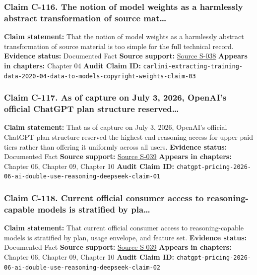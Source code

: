 \documentclass[
  american,
  11pt,
  letterpaper,
]{article}
\begin{document}
\subsubsection{Claim C-116. The notion of model weights as a harmlessly
abstract transformation of source
mat\ldots{}}\label{claim-c-116-the-notion-of-model-weights-as-a-harmlessly-abstract-transformation-of-source-mat}

\textbf{Claim statement:} That the notion of model weights as a
harmlessly abstract transformation of source material is too simple for
the full technical record. \textbf{Evidence status:} Documented Fact
\textbf{Source support:}
\hyperref[source-s-038-extracting-training-data-from-large-language-models]{Source
S-038} \textbf{Appears in chapters:} Chapter 04 \textbf{Audit Claim ID:}
\texttt{carlini-extracting-training-data-2020-04-data-to-models-copyright-weights-claim-03}

\subsubsection{Claim C-117. As of capture on July 3, 2026, OpenAI's
official ChatGPT plan structure
reserved\ldots{}}\label{claim-c-117-as-of-capture-on-july-3-2026-openai-s-official-chatgpt-plan-structure-reserved}

\textbf{Claim statement:} That as of capture on July 3, 2026, OpenAI's
official ChatGPT plan structure reserved the highest-end reasoning
access for upper paid tiers rather than offering it uniformly across all
users. \textbf{Evidence status:} Documented Fact \textbf{Source
support:}
\hyperref[source-s-039-chatgpt-plans-free-go-plus-pro-business-and-enterprise]{Source
S-039} \textbf{Appears in chapters:} Chapter 06, Chapter 09, Chapter 10
\textbf{Audit Claim ID:}
\texttt{chatgpt-pricing-2026-06-ai-double-use-reasoning-deepseek-claim-01}

\subsubsection{Claim C-118. Current official consumer access to
reasoning-capable models is stratified by
pla\ldots{}}\label{claim-c-118-current-official-consumer-access-to-reasoning-capable-models-is-stratified-by-pla}

\textbf{Claim statement:} That current official consumer access to
reasoning-capable models is stratified by plan, usage envelope, and
feature set. \textbf{Evidence status:} Documented Fact \textbf{Source
support:}
\hyperref[source-s-039-chatgpt-plans-free-go-plus-pro-business-and-enterprise]{Source
S-039} \textbf{Appears in chapters:} Chapter 06, Chapter 09, Chapter 10
\textbf{Audit Claim ID:}
\texttt{chatgpt-pricing-2026-06-ai-double-use-reasoning-deepseek-claim-02}
\end{document}

